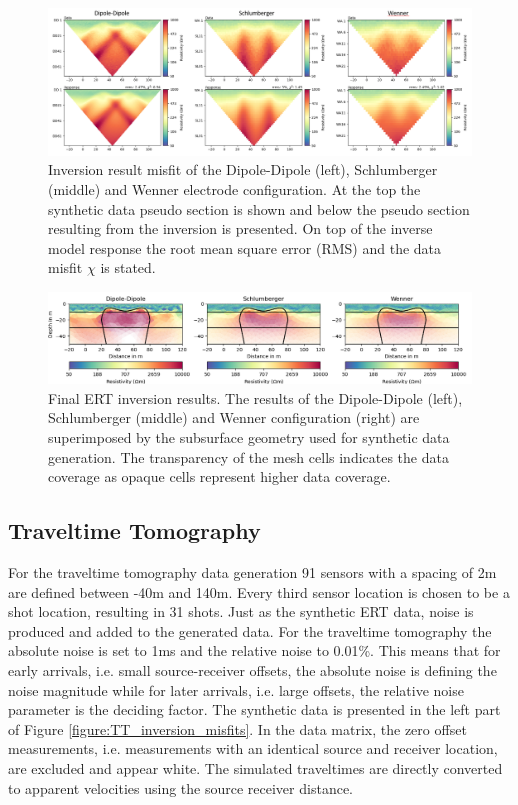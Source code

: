 \begin{figure}[H]
  \centering
    \includegraphics[width=\textwidth]{Figures/ERT_inversion_overview.png}
    \caption[ERT inversion result misfit]{Inversion result misfit of the Dipole-Dipole (left), Schlumberger (middle) and Wenner electrode configuration. At the top the synthetic data pseudo section is shown and below the pseudo section resulting from the inversion is presented. On top of the inverse model response the root mean square error (RMS) and the data misfit $\chi$ is stated.}
    \label{figure:ERT_inversion_misfits}
\end{figure}

\begin{figure}[H]
  \centering
    \includegraphics[width=\textwidth]{Figures/ERT_Inv_comp.png}
    \caption[Final resistivity models after inversion]{Final ERT inversion results. The results of the Dipole-Dipole (left), Schlumberger (middle) and Wenner configuration (right) are superimposed by the subsurface geometry used for synthetic data generation. The transparency of the mesh cells indicates the data coverage as opaque cells represent higher data coverage.}
    \label{figure:ERT_inversion_comp}
\end{figure}

\subsection{Traveltime Tomography}

For the traveltime tomography data generation 91 sensors with a spacing of 2m are defined between -40m and 140m. Every third sensor location is chosen to be a shot location, resulting in 31 shots. Just as the synthetic ERT data, noise is produced and added to the generated data. For the traveltime tomography the absolute noise is set to 1ms and the relative noise to 0.01\%. This means that for early arrivals, i.e. small source-receiver offsets, the absolute noise is defining the noise magnitude while for later arrivals, i.e. large offsets, the relative noise parameter is the deciding factor. The synthetic data is presented in the left part of Figure \ref{figure:TT_inversion_misfits}. In the data matrix, the zero offset measurements, i.e. measurements with an identical source and receiver location, are excluded and appear white. The simulated traveltimes are directly converted to apparent velocities using the source receiver distance.

